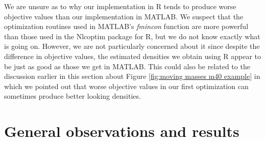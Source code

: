 We are unsure as to why our implementation in R tends to produce worse objective values than our implementation in MATLAB. We suspect that the optimization routines used in MATLAB's \emph{fmincon} function are more powerful than those used in the Nlcoptim package for R, but we do not know exactly what is going on. However, we are not particularly concerned about it since despite the difference in objective values, the estimated densities we obtain using R appear to be just as good as those we get in MATLAB. This could also be related to the discussion earlier in this section about Figure \ref{fig:moving masses m40 example} in which we pointed out that worse objective values in our first optimization can sometimes produce better looking densities.











	

\section{General observations and results}
\label{sec:deconvolution observations and results}

